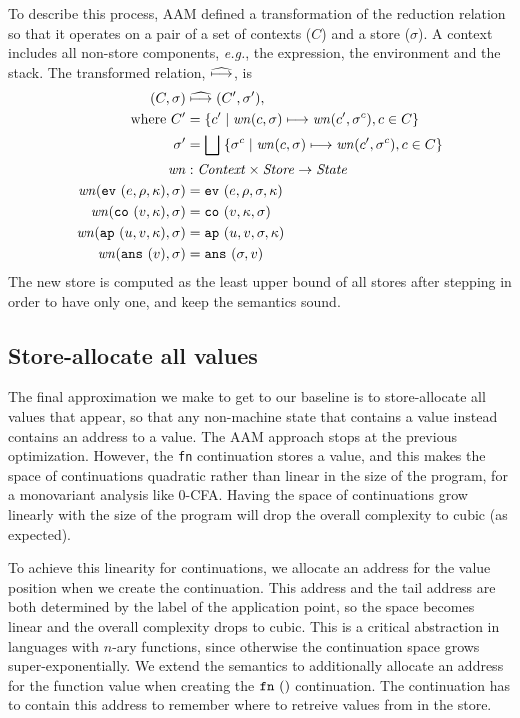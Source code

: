 \documentclass[preprint,onecolumn,9pt]{sigplanconf} %
\begin{document}
To describe this process, AAM defined a transformation of the reduction relation so that it operates on
a pair of a set of contexts ($C$) and a store ($\sigma$).
%
A context includes all non-store components, \emph{e.g.}, the expression, the environment and the stack.
%
The transformed relation, $\widehat{\mathbin{\longmapsto}}$, is
%
{\small
\begin{align*}
(C, \sigma) &\mathrel{\widehat{\mathbin{\longmapsto}}} (C', \sigma'), \\
\mbox{where } C' &= \{c' \mid \mathit{wn}(c, \sigma) \mathrel{\mathbin{\longmapsto}} \mathit{wn}(c', \sigma^c), c \in C\} \\
              \sigma' &= \bigsqcup\; \{\sigma^c \mid \mathit{wn}(c,\sigma)\mathrel{\mathbin{\longmapsto}} \mathit{wn}(c', \sigma^c), c \in C\} \\
\mathit{wn} &: \mathit{Context} \times \mathit{Store} \to \mathit{State} \\
\mathit{wn}({\tt ev}{\ }({e, \rho, \kappa}), \sigma) &= {\tt ev}{\ }({e, \rho, \sigma, \kappa}) \\
\mathit{wn}({\tt co}{\ }({v, \kappa}), \sigma) &= {\tt co}{\ }({v, \kappa, \sigma}) \\
\mathit{wn}({\tt ap}{\ }({u, v, \kappa}), \sigma) &= {\tt ap}{\ }({u, v, \sigma, \kappa}) \\
\mathit{wn}({\tt ans}{\ }({v}), \sigma) &= {\tt ans}{\ }({\sigma, v})
\end{align*}}
%
The new store is computed as the least upper bound of all
stores after stepping in order to have only one, and keep the
semantics sound.

\subsection{Store-allocate all values}
\label{sec:baselineeval}

The final approximation we make to get to our baseline is to
store-allocate all values that appear, so that any non-machine state
that contains a value instead contains an address to a value.  The AAM
approach stops at the previous optimization.  However, the {\tt fn}
continuation stores a value, and this makes the space of continuations
quadratic rather than linear in the size of the program, for a
monovariant analysis like 0-CFA.  Having the space of continuations
grow linearly with the size of the program will drop the overall
complexity to cubic (as expected).

To achieve this linearity for continuations, we allocate an address
for the value position when we create the continuation.  This address
and the tail address are both determined by the label of the
application point, so the space becomes linear and the overall
complexity drops to cubic.  This is a critical abstraction in
languages with $n$-ary functions, since otherwise the continuation
space grows super-exponentially. We extend the semantics to
additionally allocate an address for the function value when creating
the ${\tt fn}{\ }({})$ continuation. The continuation has to contain this address
to remember where to retreive values from in the store.
\end{document}
